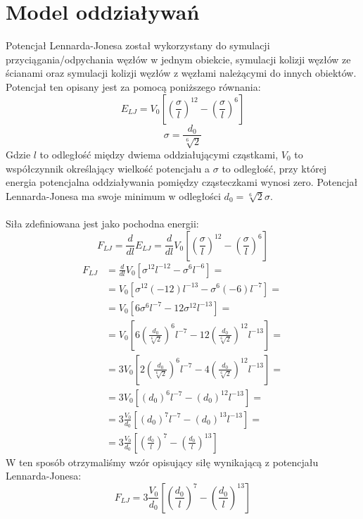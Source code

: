 \documentclass[12pt, letterpaper]{report}
\begin{document}
    \section{Model oddziaływań}
    Potencjał Lennarda-Jonesa został wykorzystany do symulacji przyciągania/odpychania 
    węzłów w jednym obiekcie, symulacji kolizji węzłów ze ścianami oraz symulacji
    kolizji węzłów z węzłami należącymi do innych obiektów. 
    Potencjał ten opisany jest za pomocą poniższego równania:
    \begin{equation}
        E_{LJ} = V_0 \left[ \left( \frac{\sigma}{l} \right)^{12} - \left( \frac{\sigma}{l} \right)^{6} \right]
    \end{equation}
    \begin{equation}
        \sigma = \frac{d_0}{\sqrt[6]{2}}
    \end{equation}
    Gdzie $l$ to odległość między dwiema oddziałującymi cząstkami, $V_0$ to współczynnik określający wielkość potencjału 
    a $\sigma$ to odległość, przy której energia potencjalna oddziaływania pomiędzy cząsteczkami wynosi zero. 
    Potencjał Lennarda-Jonesa ma swoje minimum w odległości $d_0 = \sqrt[6]{2} \sigma$. \\ \\
    Siła zdefiniowana jest jako pochodna energii:
    \begin{equation}
        F_{LJ} = 
        \frac{d}{dl} E_{LJ} = 
        \frac{d}{dl} V_0 \left[ \left( \frac{\sigma}{l} \right)^{12} - \left( \frac{\sigma}{l} \right)^{6} \right]
    \end{equation}
    \begin{align*}
        F_{LJ} &= \frac{d}{dl} V_0 \left[ \sigma^{12}l^{-12} - \sigma^{6}l^{-6} \right] =\\
        &= V_0 \left[ \sigma^{12}(-12)l^{-13} - \sigma^{6}(-6)l^{-7} \right] =\\
        &= V_0 \left[ 6\sigma^{6}l^{-7} - 12\sigma^{12}l^{-13} \right] =\\
        &= V_0 \left[ 6 \left(\frac{d_0}{\sqrt[6]{2}}\right)^{6} l^{-7} - 12 \left(\frac{d_0}{\sqrt[6]{2}}\right)^{12} l^{-13} \right] =\\
        &= 3 V_0 \left[ 2 \left(\frac{d_0}{\sqrt[6]{2}}\right)^{6} l^{-7} - 4 \left(\frac{d_0}{\sqrt[6]{2}}\right)^{12} l^{-13} \right] =\\
        &= 3 V_0 \left[ (d_{0})^{6} l^{-7} - (d_{0})^{12} l^{-13} \right] =\\
        &= 3 \frac{V_0}{d_0} \left[ (d_{0})^{7} l^{-7} - (d_{0})^{13} l^{-13} \right] =\\
        &= 3\frac{V_0}{d_0} \left[ \left(\frac{d_0}{l}\right)^{7} - \left(\frac{d_0}{l}\right)^{13} \right]
    \end{align*}
    W ten sposób otrzymaliśmy wzór opisujący siłę wynikającą z potencjału Lennarda-Jonesa:
    \begin{equation}
        F_{LJ} = 3\frac{V_0}{d_0} \left[ \left(\frac{d_0}{l}\right)^{7} - \left(\frac{d_0}{l}\right)^{13} \right]
    \end{equation}
\end{document}
